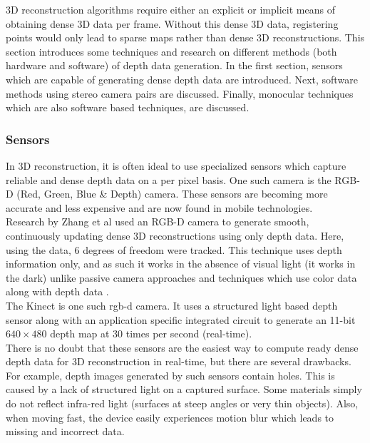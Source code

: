 
3D reconstruction algorithms require either an explicit or implicit means of obtaining dense 3D data per frame. Without this dense 3D data, registering points would only lead to sparse maps rather than dense 3D reconstructions. This section introduces some techniques and research on different methods (both hardware and software) of depth data generation. In the first section, sensors which are capable of generating dense depth data are introduced. Next, software methods using stereo camera pairs are discussed. Finally, monocular techniques which are also software based techniques, are discussed. \\


\subsubsection{Sensors}

In 3D reconstruction, it is often ideal to use specialized sensors which capture reliable and dense depth data on a per pixel basis. One such camera is the RGB-D (Red, Green, Blue \& Depth) camera. These sensors are becoming more accurate and less expensive and are now found in mobile technologies. \\

Research by Zhang et al \cite{Zhang12Microsoft} used an RGB-D camera to generate smooth, continuously updating dense 3D reconstructions using only depth data. Here, using the data, 6 degrees of freedom were tracked. This technique uses depth information only, and as such it works in the absence of visual light (it works in the dark) unlike passive camera approaches \cite{Klein07Parallel, Newcombe10Live,Stuhmer10Real} and techniques which use color data along with depth data \cite{Henry10Rgb}. \\

The Kinect is one such rgb-d camera. It uses a structured light based depth sensor along with an application specific integrated circuit to generate an 11-bit $640\times 480$ depth map at 30 times per second (real-time). \\

There is no doubt that these sensors are the easiest way to compute ready dense depth data for 3D reconstruction in real-time, but there are several drawbacks. For example, depth images generated by such sensors contain holes. This is caused by a lack of structured light on a captured surface. Some materials simply do not reflect infra-red light (surfaces at steep angles or very thin objects). Also, when moving fast, the device easily experiences motion blur which leads to missing and incorrect data. \\

